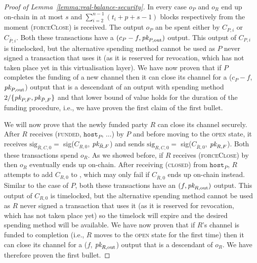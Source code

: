 \begin{proof}[Proof of Lemma~\ref{lemma:real-balance-security}]
  In every case $o_P$ and $o_R$ end up on-chain in at most $s$ and
  $\sum\limits_{i=2}^{n-1}(t_i + p + s - 1)$ blocks respectively from the moment
  (\textsc{forceClose}) is received. The output $o_P$ an be spent either by $C_{P,
  i}$ or $C_{\bar{P}, i}$. Both these transactions have a $(c_P - f, \textit{pk}_{P,
  \mathrm{out}})$ output. This output of $C_{P, i}$ is timelocked, but the
  alternative spending method cannot be used as $P$ never signed a transaction
  that uses it (as it is reserved for revocation, which has not taken place yet
  in this virtualisation layer). We have now proven that if $P$ completes the
  funding of a new channel then it can close its channel for a ($c_P - f$,
  $\textit{pk}_{P, \mathrm{out}}$) output that is a descendant of an output with spending
  method $2/\{\textit{pk}_{P, F}, \textit{pk}_{\bar{P}, F}\}$ and that lower bound of value holds
  for the duration of the funding procedure, i.e., we have proven the first claim
  of the first bullet.

  We will now prove that the newly funded party $R$ can close its channel
  securely. After $R$ receives (\textsc{funded}, $\texttt{host}_P$, $\dots$) by
  $P$ and before moving to the \textsc{open} state, it receives
  $\mathrm{sig}_{\bar{R}, C, 0} =$ sig($C_{R, 0}$, $\textit{pk}_{\bar{R}, F}$) and sends
  $\mathrm{sig}_{R, C, 0} =$ sig($C_{\bar{R}, 0}$, $\textit{pk}_{R, F}$). Both these
  transactions spend $o_R$. As we showed before, if $R$ receives
  (\textsc{forceClose}) by \environment then $o_R$ eventually ends up on-chain. After
  receiving (\textsc{closed}) from $\texttt{host}_P$, $R$ attempts to add $C_{R,
  0}$ to \ledger, which may only fail if $C_{\bar{R}, 0}$ ends up on-chain
  instead. Similar to the case of $P$, both these transactions have an $(f,
  \textit{pk}_{R, \mathrm{out}})$ output. This output of $C_{R, 0}$ is timelocked, but
  the alternative spending method cannot be used as $R$ never signed a
  transaction that uses it (as it is reserved for revocation, which has not
  taken place yet) so the timelock will expire and the desired spending method
  will be available. We have now proven that if $R$'s channel is funded to
  completion (i.e., $R$ moves to the \textsc{open} state for the first time) then
  it can close its channel for a ($f$, $\textit{pk}_{R, \mathrm{out}}$) output that is a
  descendant of $o_R$. We have therefore proven the first bullet.


\end{proof}
